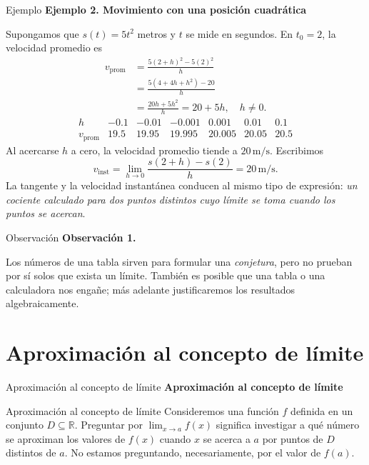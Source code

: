 \documentclass[12pt,aspectratio=169]{beamer}
\newcommand{\R}{\mathbb{R}}
\begin{document}
\begin{frame}[t,allowframebreaks]{Ejemplo}
{\color{azul}\bfseries Ejemplo 2. Movimiento con una posición cuadrática}\par\medskip

Supongamos que $s(t)=5t^2$ metros y $t$ se mide en segundos. En $t_0=2$, la velocidad promedio es
\begin{align*}
 v_{\mathrm{prom}}&=\frac{5(2+h)^2-5(2)^2}{h}\\
 &=\frac{5(4+4h+h^2)-20}{h}\\
 &=\frac{20h+5h^2}{h}=20+5h,\quad h\ne0.
\end{align*}
\[
\begin{array}{c|rrrrrr}
 h&-0.1&-0.01&-0.001&0.001&0.01&0.1\\\hline
 v_{\mathrm{prom}}&19.5&19.95&19.995&20.005&20.05&20.5
\end{array}
\]
Al acercarse $h$ a cero, la velocidad promedio tiende a $20\,\mathrm{m/s}$. Escribimos
\[
\boxed{v_{\mathrm{inst}}=\lim_{h\to0}\frac{s(2+h)-s(2)}{h}=20\,\mathrm{m/s}.}
\]
La tangente y la velocidad instantánea conducen al mismo tipo de expresión: \emph{un cociente calculado para dos puntos distintos cuyo límite se toma cuando los puntos se acercan}.
\end{frame}


\begin{frame}[t,allowframebreaks]{Observación}
{\color{azul}\bfseries Observación 1.}\par\medskip

Los números de una tabla sirven para formular una \emph{conjetura}, pero no prueban por sí solos que exista un límite. También es posible que una tabla o una calculadora nos engañe; más adelante justificaremos los resultados algebraicamente.
\end{frame}


\section{Aproximación al concepto de límite}

\begin{frame}[t]{Aproximación al concepto de límite}
\centering\vfill{\Large\bfseries\color{azul} Aproximación al concepto de límite}\vfill
\end{frame}


\begin{frame}[t,allowframebreaks]{Aproximación al concepto de límite}
Consideremos una función $f$ definida en un conjunto $D\subseteq\R$. Preguntar por $\lim_{x\to a}f(x)$ significa investigar a qué número se aproximan los valores de $f(x)$ cuando $x$ se acerca a $a$ por puntos de $D$ distintos de $a$. No estamos preguntando, necesariamente, por el valor de $f(a)$.
\end{frame}
\end{document}

